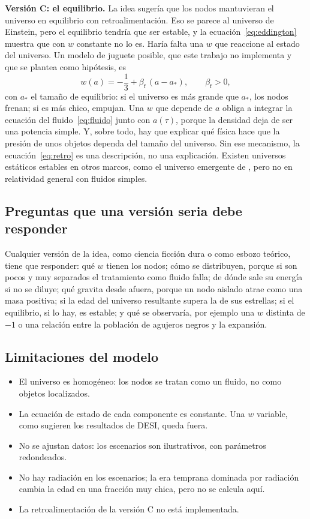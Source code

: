 \documentclass[11pt,a4paper]{article}
\begin{document}
\textbf{Versión C: el equilibrio.} La idea sugería que los nodos mantuvieran el universo en equilibrio con retroalimentación. Eso se parece al universo de Einstein, pero el equilibrio tendría que ser estable, y la ecuación~\eqref{eq:eddington} muestra que con $w$ constante no lo es. Haría falta una $w$ que reaccione al estado del universo. Un modelo de juguete posible, que este trabajo no implementa y que se plantea como hipótesis, es
\begin{equation}\label{eq:retro}
w(a) = -\frac13 + \beta_{\mathrm f}\,(a - a_*), \qquad \beta_{\mathrm f} > 0,
\end{equation}
con $a_*$ el tamaño de equilibrio: si el universo es más grande que $a_*$, los nodos frenan; si es más chico, empujan. Una $w$ que depende de $a$ obliga a integrar la ecuación del fluido~\eqref{eq:fluido} junto con $a(\tau)$, porque la densidad deja de ser una potencia simple. Y, sobre todo, hay que explicar qué física hace que la presión de unos objetos dependa del tamaño del universo. Sin ese mecanismo, la ecuación~\eqref{eq:retro} es una descripción, no una explicación. Existen universos estáticos estables en otros marcos, como el universo emergente de \textcite{ellis2004}, pero no en relatividad general con fluidos simples.

\subsection{Preguntas que una versión seria debe responder}

Cualquier versión de la idea, como ciencia ficción dura o como esbozo teórico, tiene que responder: qué $w$ tienen los nodos; cómo se distribuyen, porque si son pocos y muy separados el tratamiento como fluido falla; de dónde sale su energía si no se diluye; qué gravita desde afuera, porque un nodo aislado atrae como una masa positiva; si la edad del universo resultante supera la de sus estrellas; si el equilibrio, si lo hay, es estable; y qué se observaría, por ejemplo una $w$ distinta de $-1$ o una relación entre la población de agujeros negros y la expansión.

\subsection{Limitaciones del modelo}

\begin{itemize}
\item El universo es homogéneo: los nodos se tratan como un fluido, no como objetos localizados.
\item La ecuación de estado de cada componente es constante. Una $w$ variable, como sugieren los resultados de DESI, queda fuera.
\item No se ajustan datos: los escenarios son ilustrativos, con parámetros redondeados.
\item No hay radiación en los escenarios; la era temprana dominada por radiación cambia la edad en una fracción muy chica, pero no se calcula aquí.
\item La retroalimentación de la versión C no está implementada.
\end{itemize}
\end{document}
